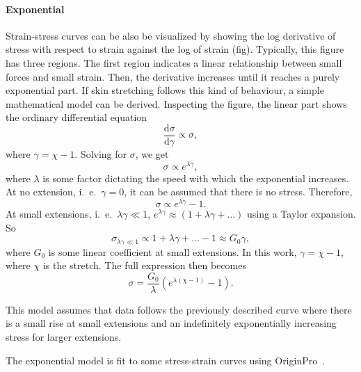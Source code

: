 \paragraph{Exponential}
Strain-stress curves can be also be visualized by showing the log derivative of stress with respect to strain against the log of strain (fig).
Typically, this figure has three regions.
The first region indicates a linear relationship between small forces and small strain.
Then, the derivative increases until it reaches a purely exponential part.
If skin stretching follows this kind of behaviour, a simple mathematical model can be derived.
Inspecting the figure, the linear part shows the ordinary differential equation
\begin{equation}
    \frac{\mathrm{d}\sigma}{\mathrm{d}\gamma} \propto \sigma,
\end{equation}
where $\gamma = \chi - 1$.
Solving for $\sigma$, we get
\begin{equation}
    \sigma \propto e^{\lambda\gamma},
\end{equation}
where $\lambda$ is some factor dictating the speed with which the exponential increases.
At no extension, i.\ e.\ $\gamma=0$, it can be assumed that there is no stress.
Therefore,
\begin{equation}
    \sigma \propto e^{\lambda\gamma} - 1.
\end{equation}
At small extensions, i.\ e.\ $\lambda\gamma \ll 1$, $e^{\lambda\gamma} \approx (1 + \lambda\gamma + \ldots)$ using a Taylor expansion.
So
\begin{equation}
    \sigma_{\lambda\gamma\ll 1} \propto 1 + \lambda\gamma + \ldots - 1 \approx G_0 \gamma,
\end{equation}
where $G_0$ is some linear coefficient at small extensions.
In this work, $\gamma = \chi - 1$, where $\chi$ is the stretch.
The full expression then becomes
\begin{equation}\label{eq:exp}
    \sigma = \frac{G_0}{\lambda}\left(e^{\lambda(\chi - 1)}-1\right).
\end{equation}

This model assumes that data follows the previously described curve where there is a small rise at small extensions and an indefinitely exponentially increasing stress for larger extensions.

The exponential model is fit to some stress-strain curves using OriginPro~\cite{OriginPro}.

